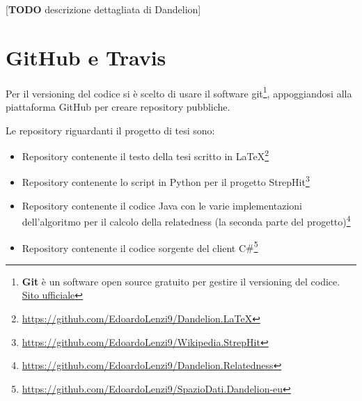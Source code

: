 [\textbf{TODO} descrizione dettagliata di Dandelion]

\section{GitHub e Travis}
Per il versioning del codice si è scelto di usare il software git\footnote{
    \textbf{Git} è un software open source gratuito per gestire il versioning del codice. \href{https://git-scm.com/}{Sito ufficiale}   
}, appoggiandosi alla piattaforma GitHub per creare repository pubbliche. 

Le repository riguardanti il progetto di tesi sono:

\begin{itemize}
    \item Repository contenente il testo della tesi scritto in \LaTeX\footnote{\url{https://github.com/EdoardoLenzi9/Dandelion.LaTeX}} \\
    \item Repository contenente lo script in Python per il progetto StrepHit\footnote{\url{https://github.com/EdoardoLenzi9/Wikipedia.StrepHit}} \\
    \item Repository contenente il codice Java con le varie implementazioni dell'algoritmo per il calcolo della relatedness (la seconda parte del progetto)\footnote{\url{https://github.com/EdoardoLenzi9/Dandelion.Relatedness}} \\
    \item Repository contenente il codice sorgente del client C$\#$\footnote{\url{https://github.com/EdoardoLenzi9/SpazioDati.Dandelion-eu}}\\
\end{itemize} 


